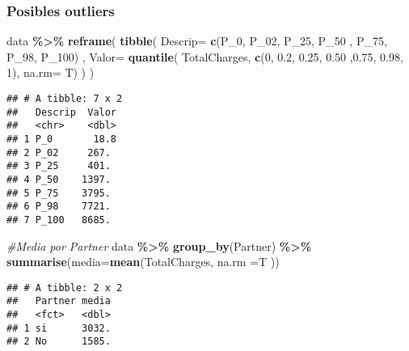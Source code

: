 \documentclass[
]{article}
\newenvironment{Shaded}{\begin{snugshade}}{\end{snugshade}}
\newcommand{\AttributeTok}[1]{\textcolor[rgb]{0.13,0.29,0.53}{#1}}
\newcommand{\CommentTok}[1]{\textcolor[rgb]{0.56,0.35,0.01}{\textit{#1}}}
\newcommand{\DecValTok}[1]{\textcolor[rgb]{0.00,0.00,0.81}{#1}}
\newcommand{\FloatTok}[1]{\textcolor[rgb]{0.00,0.00,0.81}{#1}}
\newcommand{\FunctionTok}[1]{\textcolor[rgb]{0.13,0.29,0.53}{\textbf{#1}}}
\newcommand{\NormalTok}[1]{#1}
\newcommand{\SpecialCharTok}[1]{\textcolor[rgb]{0.81,0.36,0.00}{\textbf{#1}}}
\newcommand{\StringTok}[1]{\textcolor[rgb]{0.31,0.60,0.02}{#1}}
\begin{document}
\hypertarget{posibles-outliers}{%
\subsubsection{Posibles outliers}\label{posibles-outliers}}

\begin{Shaded}
\begin{Highlighting}[]
\NormalTok{data }\SpecialCharTok{\%\textgreater{}\%} 
  \FunctionTok{reframe}\NormalTok{( }
    \FunctionTok{tibble}\NormalTok{(}
      \AttributeTok{Descrip=} \FunctionTok{c}\NormalTok{(}\StringTok{\textquotesingle{}P\_0\textquotesingle{}}\NormalTok{, }\StringTok{\textquotesingle{}P\_02\textquotesingle{}}\NormalTok{, }\StringTok{\textquotesingle{}P\_25\textquotesingle{}}\NormalTok{, }\StringTok{\textquotesingle{}P\_50\textquotesingle{}}\NormalTok{ , }\StringTok{\textquotesingle{}P\_75\textquotesingle{}}\NormalTok{, }\StringTok{\textquotesingle{}P\_98\textquotesingle{}}\NormalTok{, }\StringTok{\textquotesingle{}P\_100\textquotesingle{}}\NormalTok{) ,}
      \AttributeTok{Valor=} \FunctionTok{quantile}\NormalTok{( TotalCharges, }\FunctionTok{c}\NormalTok{(}\DecValTok{0}\NormalTok{, }\FloatTok{0.2}\NormalTok{, }\FloatTok{0.25}\NormalTok{, }\FloatTok{0.50}\NormalTok{ ,}\FloatTok{0.75}\NormalTok{, }\FloatTok{0.98}\NormalTok{, }\DecValTok{1}\NormalTok{), }\AttributeTok{na.rm=}\NormalTok{ T)}
\NormalTok{    )}
\NormalTok{    )}
\end{Highlighting}
\end{Shaded}

\begin{verbatim}
## # A tibble: 7 x 2
##   Descrip  Valor
##   <chr>    <dbl>
## 1 P_0       18.8
## 2 P_02     267. 
## 3 P_25     401. 
## 4 P_50    1397. 
## 5 P_75    3795. 
## 6 P_98    7721. 
## 7 P_100   8685.
\end{verbatim}

\begin{Shaded}
\begin{Highlighting}[]
\CommentTok{\#Media por Partner}
\NormalTok{data }\SpecialCharTok{\%\textgreater{}\%} 
        \FunctionTok{group\_by}\NormalTok{(Partner) }\SpecialCharTok{\%\textgreater{}\%} 
        \FunctionTok{summarise}\NormalTok{(}\AttributeTok{media=}\FunctionTok{mean}\NormalTok{(TotalCharges,}
                          \AttributeTok{na.rm =}\NormalTok{T ))}
\end{Highlighting}
\end{Shaded}

\begin{verbatim}
## # A tibble: 2 x 2
##   Partner media
##   <fct>   <dbl>
## 1 si      3032.
## 2 No      1585.
\end{verbatim}
\end{document}
